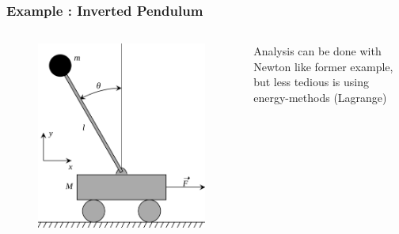 \begin{frame}
	\frametitle{Example : Inverted Pendulum}
	\begin{columns}
		\begin{column}{0.6\linewidth}
			\begin{figure}
				\includegraphics[width=0.9\linewidth]{img/pendulum-inverted}
				\label{fig:pendulum-inverted}
			\end{figure}
		\end{column}
		\begin{column}{0.4\linewidth}
			Analysis can be done with Newton like former example, but less tedious is using energy-methods (Lagrange)
			
		\end{column}
	\end{columns}
	
\end{frame}

